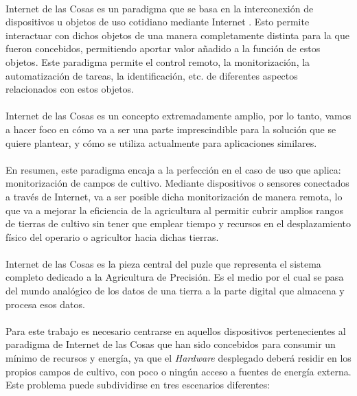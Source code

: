 \documentclass[../../memoria.tex]{subfiles}
\begin{document}
\paragraph{}
Internet de las Cosas es un paradigma que se basa en la interconexión de dispositivos u objetos de uso cotidiano mediante Internet \cite{iotwiki}. Esto permite interactuar con dichos objetos de una manera completamente distinta para la que fueron concebidos, permitiendo aportar valor añadido a la función de estos objetos. Este paradigma permite el control remoto, la monitorización, la automatización de tareas, la identificación, etc. de diferentes aspectos relacionados con estos objetos.

\paragraph{}
Internet de las Cosas es un concepto extremadamente amplio, por lo tanto, vamos a hacer foco en cómo va a ser una parte imprescindible para la solución que se quiere plantear, y cómo se utiliza actualmente para aplicaciones similares.

\paragraph{}
En resumen, este paradigma encaja a la perfección en el caso de uso que aplica: monitorización de campos de cultivo. Mediante dispositivos o sensores conectados a través de Internet, va a ser posible dicha monitorización de manera remota, lo que va a mejorar la eficiencia de la agricultura al permitir cubrir amplios rangos de tierras de cultivo sin tener que emplear tiempo y recursos en el desplazamiento físico del operario o agricultor hacia dichas tierras.

\paragraph{}
Internet de las Cosas es la pieza central del puzle que representa el sistema completo dedicado a la Agricultura de Precisión. Es el medio por el cual se pasa del mundo analógico de los datos de una tierra a la parte digital que almacena y procesa esos datos.

\paragraph{}
Para este trabajo es necesario centrarse en aquellos dispositivos pertenecientes al paradigma de Internet de las Cosas que han sido concebidos para consumir un mínimo de recursos y energía, ya que el \textit{Hardware} desplegado deberá residir en los propios campos de cultivo, con poco o ningún acceso a fuentes de energía externa. Este problema puede subdividirse en tres escenarios diferentes:
\end{document}
